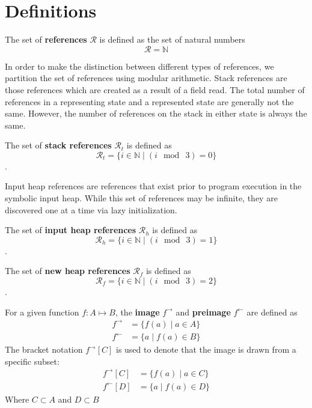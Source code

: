 \section{Definitions}

\begin{definition}
The set of \textbf{references} $\mathcal{R}$ is defined as the set of natural numbers
 $$\mathcal{R} = \mathbb{N}$$
\end{definition}

In order to make the distinction between different types of references, we partition the set of references using modular arithmetic. Stack references are those references which are created as a result of a field read. The total number of references in a representing state and a represented state are generally not the same. However, the number of references on the stack in either state is always the same. 

\begin{definition}
The set of \textbf{stack references} $\mathcal{R}_t$ is defined as
 $$\mathcal{R}_t =\{i \in \mathbb{N} \mid ( i\ \bmod\ 3 ) = 0\}$$. 
\end{definition}

Input heap references are references that exist prior to program execution in the symbolic input heap. While this set of references may be infinite, they are discovered one at a time via lazy initialization.

\begin{definition}
The set of \textbf{input heap references} $\mathcal{R}_h$ is defined as
 $$\mathcal{R}_h =\{i \in \mathbb{N} \mid ( i\ \bmod\ 3 ) = 1\}$$. 
\end{definition}

\begin{definition}
The set of \textbf{new heap references} $\mathcal{R}_f$ is defined as
 $$\mathcal{R}_f =\{i \in \mathbb{N} \mid ( i\ \bmod\ 3 ) = 2\}$$. 
\end{definition}

\begin{definition}
For a given function $f:A \mapsto B$, the \textbf{image} $f^\rightarrow$ and \textbf{preimage} $f^\leftarrow$ are defined as
\begin{align}
 f^\rightarrow &= \{ f(a) \mid a \in A\}\\
 f^\leftarrow &= \{ a \mid f(a) \in B \}
 \end{align}
 The bracket notation $ f^\rightarrow [C] $ is used to denote that the image is drawn from a specific subset:
 \begin{align}
 f^\rightarrow [C] &= \{ f(a) \mid a \in C\}\\
 f^\leftarrow [D] &= \{ a \mid f(a) \in D \}
 \end{align}
 Where $C \subset A$ and $D \subset B$
\end{definition}

